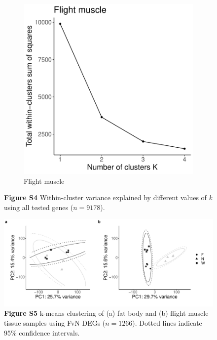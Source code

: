 \documentclass[12pt]{article}
\begin{document}
\begin{figure}[ht]
\begin{subfigure}[t]{0.45\textwidth}
        \includegraphics[width=\linewidth]{figs4b.pdf} 
        \caption{Flight muscle} \label{fig:S4b}
    \end{subfigure}
    \caption*{\textbf{Figure S4} \quad Within-cluster variance explained by different values of \textit{k} using all tested genes ($n=9178$).}
\end{figure}

\pagebreak

\begin{figure}[ht]
    \centering
		\includegraphics[width=1\linewidth]{figs5.pdf} 
     \caption*{\textbf{Figure S5} \quad k-means clustering of (a) fat body and (b) flight muscle tissue samples using FvN DEGs ($n=1266$). Dotted lines indicate 95\% confidence intervals.}
    \label{fig:S5}
\end{figure}
\end{document}
